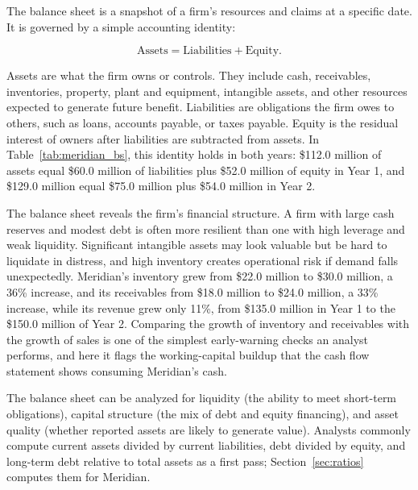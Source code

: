 \documentclass[../ai_in_finance]{subfiles}
\begin{document}
The balance sheet is a snapshot of a firm's resources and claims at a specific date. It is governed by a simple accounting identity:

\begin{equation}
\text{Assets} = \text{Liabilities} + \text{Equity}.\label{eq:statements-accounting-identity}
\end{equation}

Assets are what the firm owns or controls. They include cash, receivables, inventories, property, plant and equipment, intangible assets, and other resources expected to generate future benefit. Liabilities are obligations the firm owes to others, such as loans, accounts payable, or taxes payable. Equity is the residual interest of owners after liabilities are subtracted from assets. In Table~\ref{tab:meridian_bs}, this identity holds in both years: \$112.0 million of assets equal \$60.0 million of liabilities plus \$52.0 million of equity in Year 1, and \$129.0 million equal \$75.0 million plus \$54.0 million in Year 2.

The balance sheet reveals the firm's financial structure. A firm with large cash reserves and modest debt is often more resilient than one with high leverage and weak liquidity. Significant intangible assets may look valuable but be hard to liquidate in distress, and high inventory creates operational risk if demand falls unexpectedly. Meridian's inventory grew from \$22.0 million to \$30.0 million, a 36\% increase, and its receivables from \$18.0 million to \$24.0 million, a 33\% increase, while its revenue grew only 11\%, from \$135.0 million in Year 1 to the \$150.0 million of Year 2. Comparing the growth of inventory and receivables with the growth of sales is one of the simplest early-warning checks an analyst performs, and here it flags the working-capital buildup that the cash flow statement shows consuming Meridian's cash.

The balance sheet can be analyzed for liquidity (the ability to meet short-term obligations), capital structure (the mix of debt and equity financing), and asset quality (whether reported assets are likely to generate value). Analysts commonly compute current assets divided by current liabilities, debt divided by equity, and long-term debt relative to total assets as a first pass; Section~\ref{sec:ratios} computes them for Meridian.
\end{document}
